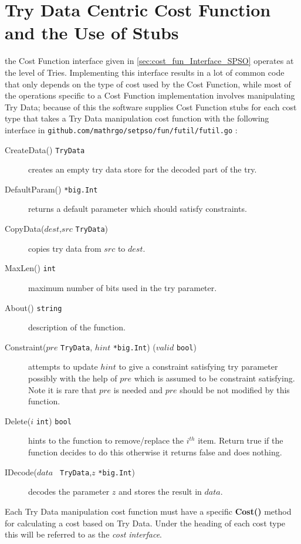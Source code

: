 \documentclass[a4paper,oneside,english]{book}
\numberwithin{equation}{section}
\numberwithin{figure}{section}
\newcommand{\codesorc}[1]{\texttt{github.com/mathrgo/setpso/#1}}
\begin{document}
\section{Try Data Centric Cost Function and the Use of Stubs \label{sec:Stubs}}
the Cost Function interface given in \ref{sec:cost_fun_Interface_SPSO} operates at the level of Tries. Implementing this interface results in a lot of common code that only depends on the type of cost used by the Cost Function, while most of the operations specific to a Cost Function implementation involves manipulating Try Data; because of this the software supplies Cost Function stubs for each cost type that takes a Try Data manipulation cost function with the following interface in \codesorc{fun/futil/futil.go} :
\begin{description}
	\item[CreateData() \texttt{TryData}] creates an empty try data store for the decoded part of the try.
	\item[DefaultParam() \texttt{*big.Int}]  returns a default parameter which should satisfy constraints.
	\item[CopyData($ dest $,$  src $ \texttt{TryData})] copies try data from $ src  $ to $ dest $.
	\item[MaxLen() \texttt{int}] maximum number of bits used in the try parameter.
	\item[About() \texttt{string}] description of the function.
	\item[Constraint($ pre $ \texttt{TryData}, $ hint $ \texttt{*big.Int}) ($ valid $ \texttt{bool})] attempts to update $ hint $ to give a constraint satisfying try parameter possibly with the help of $ pre  $ which is assumed to be constraint satisfying. Note it is rare that $ pre $ is needed and $ pre $ should be not modified by this function.
	\item[Delete($ i  $ \texttt{int}) \texttt{bool}]  hints to the function to remove/replace the $  i^{th} $ item. Return true if the function decides to do this otherwise it returns false and does nothing.
	\item[IDecode($ data $ \texttt{ TryData},$  z $ \texttt{*big.Int})] decodes the parameter $ z $ and stores the result in $ data $.

\end{description}   
	Each Try Data manipulation cost function must have  a specific \textbf{Cost()} method for calculating a cost based on Try Data. Under the heading of each cost type  this will be referred to as the \emph{cost interface}.
\end{document}
